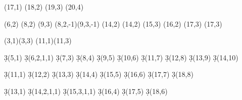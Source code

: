 \begin{sseqpage}
\class["\alpha_9" {below=0.2em}] (17,1)
\etaclass(18,2)
\etaclass(19,3)
\etaclass(20,4)





\class["{\beta_{2/2}}" {below=0.05em}](6,2)
\class["\beta_2" {below=0.2em}](8,2)
\class["\alpha_{2/2}^3" {below=0.2em}](9,3) \structline(8,2,-1)(9,3,-1)
\class["{\beta_{4/4}}" {below=0.2em}](14,2)
\class["\beta_3" {below right=0.2em}](14,2) \etaclass(15,3)
\class["{\beta_{4/3}}" {below=0.2em}](16,2) \etaclass(17,3)
\class["{\alpha_{2/2} \beta_3}" {below=0.2em}](17,3)


(3,1)(3,3)
(11,1)(11,3)

\d3(5,1)
\d3(6,2,1,1)
\d3(7,3)
\d3(8,4)
\d3(9,5)
\d3(10,6)
\d3(11,7)
\d3(12,8)
\d3(13,9)
\d3(14,10)

\d3(11,1)
\d3(12,2)
\d3(13,3)
\d3(14,4)
\d3(15,5)
\d3(16,6)
\d3(17,7)
\d3(18,8)

\d3(13,1)
\d3(14,2,1,1)
\d3(15,3,1,1)
\d3(16,4)
\d3(17,5)
\d3(18,6)

\end{sseqpage}
